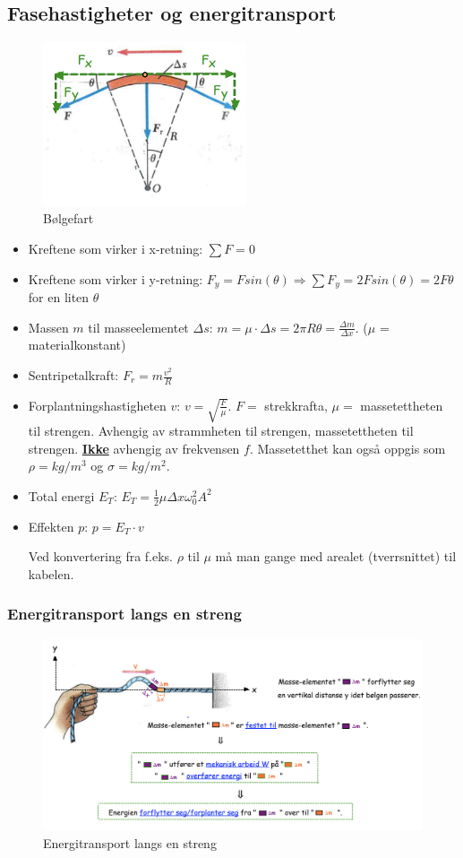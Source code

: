 \documentclass[12pt]{article}
\begin{document}
\subsection{Fasehastigheter og energitransport}
\begin{figure} [H]
    \centering
    \includegraphics[width = 6cm]{images/wavy.png}
    \caption{Bølgefart}
\end{figure}
\begin{itemize}
    \item[] Kreftene som virker i x-retning: $\sum F = 0$
    \item[] Kreftene som virker i y-retning: $F_y = Fsin(\theta) \Rightarrow \sum F_y = 2Fsin(\theta) = 2F\theta$ for en liten $\theta$
    \item[] Massen $m$ til masseelementet $\Delta s$: $m = \mu \cdot \Delta s = 2\pi R\theta = \frac{\Delta m}{\Delta x}$. ($\mu$ = materialkonstant)
    \item[] Sentripetalkraft: $F_r = m \frac{v^2}{R}$
    \item[] Forplantningshastigheten $v$: $v = \sqrt{\frac{F}{\mu}}$. $F =$ strekkrafta, $\mu =$ massetettheten til strengen. Avhengig av strammheten til strengen, massetettheten til strengen. \underline{\textbf{Ikke}} avhengig av frekvensen $f$.  Massetetthet kan også oppgis som $\rho = kg/m^3 $ og $\sigma = kg/m^2 $.
    \item[] Total energi $E_T$: $E_T = \frac{1}{2}\mu\Delta x \omega_0^2A^2$
    \item[] Effekten $p$: $p = E_T \cdot v$

Ved konvertering fra f.eks. $\rho$ til $\mu$ må man gange med arealet (tverrsnittet) til kabelen.
\end{itemize}
\subsubsection{Energitransport langs en streng}
\begin{figure} [H]
    \centering
    \includegraphics[width = 13cm]{images/string.png}
    \caption{Energitransport langs en streng}
\end{figure}
\end{document}
